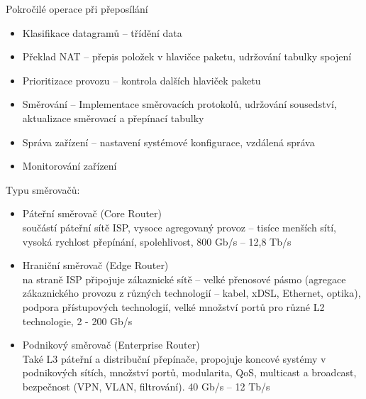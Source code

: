 \documentclass[a4paper, 11pt]{report}
\begin{document}
Pokročilé operace při přeposílání
\begin{itemize}
	\item Klasifikace datagramů -- třídění data
	\item Překlad NAT -- přepis položek v hlavičce paketu, udržování tabulky spojení
	\item Prioritizace provozu -- kontrola dalších hlaviček paketu
	\item Směrování -- Implementace směrovacích protokolů, udržování sousedství, aktualizace směrovací a přepínací tabulky
	\item Správa zařízení -- nastavení systémové konfigurace, vzdálená správa
	\item Monitorování zařízení
\end{itemize}

Typu směrovačů:
\begin{itemize}
	\item Páteřní směrovač (Core Router)\\
	součástí páteřní sítě ISP, vysoce agregovaný provoz -- tisíce menších sítí, vysoká rychlost přepínání, spolehlivost, 800 Gb/s -- 12,8 Tb/s
	\item Hraniční směrovač (Edge Router)\\
	na straně ISP připojuje zákaznické sítě -- velké přenosové pásmo (agregace zákaznického provozu z různých technologií -- kabel, xDSL, Ethernet, optika), podpora přístupových technologií, velké množství portů pro různé L2 technologie, 2 - 200 Gb/s
	\item Podnikový směrovač (Enterprise Router)\\
	Také L3 páteřní a distribuční přepínače, propojuje koncové systémy v podnikových sítích, množství portů, modularita, QoS, multicast a broadcast, bezpečnost (VPN, VLAN, filtrování). 40 Gb/s -- 12 Tb/s
\end{itemize}
\end{document}
